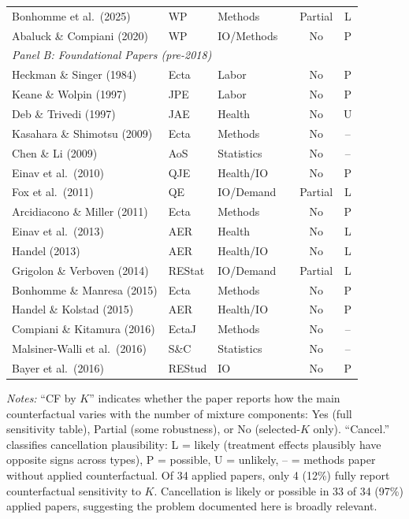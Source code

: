 \documentclass[12pt]{article}
\begin{document}
\begin{table}[H]
\begin{threeparttable}
\begin{tabular}{llllcc}
Bonhomme et al.\ (2025) & WP & Methods & & Partial & L \\
Abaluck \& Compiani (2020) & WP & IO/Methods & & No & P \\
[4pt]
\multicolumn{6}{l}{\textit{Panel B: Foundational Papers (pre-2018)}} \\[2pt]
Heckman \& Singer (1984) & Ecta & Labor & & No & P \\
Keane \& Wolpin (1997) & JPE & Labor & & No & P \\
Deb \& Trivedi (1997) & JAE & Health & & No & U \\
Kasahara \& Shimotsu (2009) & Ecta & Methods & & No & -- \\
Chen \& Li (2009) & AoS & Statistics & & No & -- \\
Einav et al.\ (2010) & QJE & Health/IO & & No & P \\
Fox et al.\ (2011) & QE & IO/Demand & & Partial & L \\
Arcidiacono \& Miller (2011) & Ecta & Methods & & No & P \\
Einav et al.\ (2013) & AER & Health & & No & L \\
Handel (2013) & AER & Health/IO & & No & L \\
Grigolon \& Verboven (2014) & REStat & IO/Demand & & Partial & L \\
Bonhomme \& Manresa (2015) & Ecta & Methods & & No & P \\
Handel \& Kolstad (2015) & AER & Health/IO & & No & P \\
Compiani \& Kitamura (2016) & EctaJ & Methods & & No & -- \\
Malsiner-Walli et al.\ (2016) & S\&C & Statistics & & No & -- \\
Bayer et al.\ (2016) & REStud & IO & & No & P \\
\bottomrule
\end{tabular}
\begin{tablenotes}
\small
\item \textit{Notes:} ``CF by $K$'' indicates whether the paper reports how the main counterfactual varies with the number of mixture components: Yes (full sensitivity table), Partial (some robustness), or No (selected-$K$ only). ``Cancel.'' classifies cancellation plausibility: L = likely (treatment effects plausibly have opposite signs across types), P = possible, U = unlikely, -- = methods paper without applied counterfactual. Of 34 applied papers, only 4 (12\%) fully report counterfactual sensitivity to $K$. Cancellation is likely or possible in 33 of 34 (97\%) applied papers, suggesting the problem documented here is broadly relevant.
\end{tablenotes}
\end{threeparttable}
\end{table}
\end{document}
